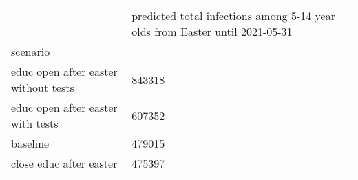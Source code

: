 \begin{tabular}{lp{}}
\toprule
{} &  predicted total infections among 5-14 year olds from Easter until 2021-05-31 \\
scenario                               &                                                                               \\
\midrule
 educ open after easter  without tests &                                             843318 \\
 educ open after easter  with tests    &                                             607352 \\
 baseline                              &                                             479015 \\
 close educ after easter               &                                             475397 \\
\bottomrule
\end{tabular}
